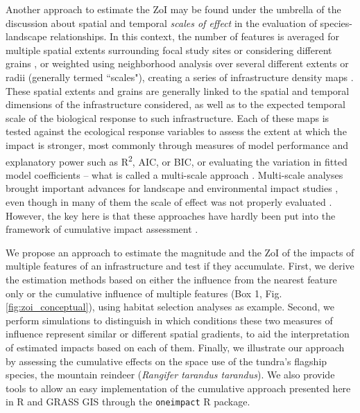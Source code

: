 \documentclass[titlepage]{article}
\begin{document}
Another approach to estimate the ZoI may be found under the umbrella of the discussion about spatial and temporal \textit{scales of effect} in the evaluation of species-landscape relationships. In this context, the number of features is averaged for multiple spatial extents surrounding focal study sites \citep{jackson_are_2015} or considering different grains \citep{laforge_process-focussed_2015}, or weighted using neighborhood analysis over several different extents or radii (generally termed ``scales"), creating a series of infrastructure density maps \citep{mcgarigal_multi-scale_2016}. These spatial extents and grains are generally linked to the spatial and temporal dimensions of the infrastructure considered, as well as to the expected temporal scale of the biological response to such infrastructure. Each of these maps is tested against the ecological response variables to assess the extent at which the impact is stronger, most commonly through measures of model performance and explanatory power such as R\textsuperscript{2}, AIC, or BIC, or evaluating the variation in fitted model coefficients \citep{jackson_are_2015, huais_multifit_2018} -- what is called a multi-scale approach \citep[e.g.][]{zeller_multi-level_2017}.
Multi-scale analyses brought important advances for landscape and environmental impact studies \citep[e.g.][]{mcgarigal_multi-scale_2016}, even though in many of them the scale of effect was not properly evaluated \citep{jackson_are_2015}. However, the key here is that these approaches have hardly been put into the framework of cumulative impact assessment \citep[but see][]{polfus_identifying_2011}.

We propose an approach to estimate the magnitude and the ZoI of the impacts of multiple features of an infrastructure and test if they accumulate. First, we derive the estimation methods based on either the influence from the nearest feature only or the cumulative influence of multiple features (Box 1, Fig. \ref{fig:zoi_conceptual}), using habitat selection analyses as example. Second, we perform simulations to distinguish in which conditions these two measures of influence represent similar or different spatial gradients, to aid the interpretation of estimated impacts based on each of them. 
Finally, we illustrate our approach by assessing the cumulative effects on the space use of the tundra's flagship species, the mountain reindeer (\textit{Rangifer tarandus tarandus}). We also provide tools to allow an easy implementation of the cumulative approach presented here in R \citep{r_core_team_r_2020} and GRASS GIS \citep{grass_development_team_geographic_2017} through the \verb|oneimpact| R package.
\end{document}
